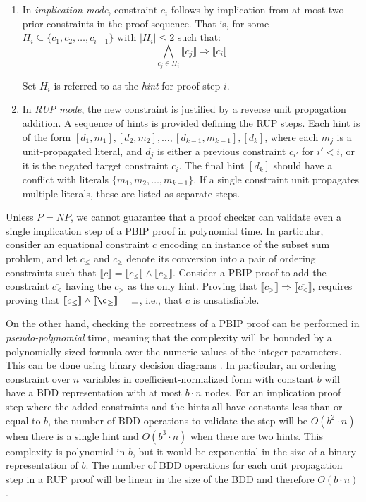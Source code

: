 \message{ !name(FMCAD2024.tex)}\documentclass{fmcad}
\begin{document}
\begin{enumerate}
\item In \textit{implication mode}, constraint $c_i$ follows by implication from at most two prior
  constraints in the proof sequence. That is, for some $H_i \subseteq \{c_1, c_2, \dots, c_{i - 1}\}$
  with $|H_i| \leq 2$ such that:
  \begin{equation}
    \label{eq:clausal-hints}
    \bigwedge_{c_j \in H_i} \llbracket c_j \rrbracket \Rightarrow \llbracket c_i \rrbracket
  \end{equation}

  Set $H_i$  is referred to as the \textit{hint} for proof step $i$.
\item In \textit{RUP mode}, the new constraint is justified by a reverse unit propagation addition.
  A sequence of hints is provided defining the RUP steps. Each hint is of the form $[d_1, m_1],
  [d_2, m_2], \dots, [d_{k - 1}, m_{k - 1}], [d_k]$, where each $m_j$ is a unit-propagated literal,
  and $d_j$ is either a previous constraint $c_{i'}$ for $i' < i$, or it is the negated target
  constraint $\overline{c_i}$. The final hint $[d_k]$ should have a conflict with literals
  $\{m_1, m_2, \dots, m_{k - 1}\}$. If a single constraint unit propagates multiple literals,
  these are listed as separate steps.
\end{enumerate}

Unless $P = NP$, we cannot guarantee that a proof checker can validate even a single implication
step of a PBIP proof in polynomial time. In particular, consider an equational constraint $c$
encoding an instance of the subset sum problem, and let $c_{\leq}$ and $c_{\geq}$ denote its conversion
into a pair of ordering constraints such that $\llbracket c \rrbracket = \llbracket c_{\leq}
\rrbracket \land \llbracket c_\geq \rrbracket$. Consider a PBIP proof to add the constraint
$\overline{c_{\leq}}$ having the $c_{\geq}$ as the only hint. Proving that
$\llbracket c_\geq \rrbracket \Rightarrow \llbracket \overline{c_\leq} \rrbracket$, requires proving
that $\llbracket c_\leq \rrbracket \land \llbracket \c_\geq \rrbracket = \bot$, i.e., that
$c$ is unsatisfiable.

On the other hand, checking the correctness of a PBIP proof can be performed in
\textit{pseudo-polynomial} time, meaning that the complexity will be bounded by a polynomially sized
formula over the numeric values of the integer parameters. This can be done using binary decision
diagrams \cite{bryant2022clausal}. In particular, an ordering constraint over $n$ variables in
coefficient-normalized form with constant $b$ will have a BDD representation with at most $b \cdot n$
nodes. For an implication proof step where the added constraints and the hints all have constants
less than or equal to $b$, the number of BDD operations to validate the step will be $O(b^2 \cdot n)$
when there is a single hint and $O(b^3 \cdot n)$ when there are two hints. This complexity is
polynomial in $b$, but it would be exponential in the size of a binary representation of $b$. The
number of BDD operations for each unit propagation step in a RUP proof will be linear in the size
of the BDD and therefore $O(b \cdot n)$.
\end{document}
